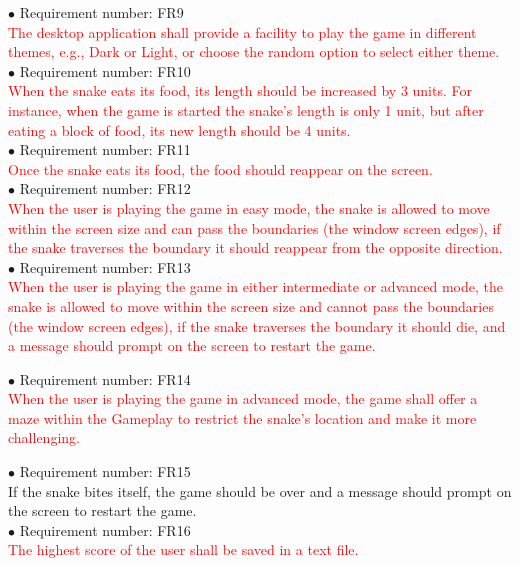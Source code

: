 \documentclass[12pt, titlepage]{article}
\begin{document}
$\bullet$ Requirement number: FR9\\
\textcolor{red}{The desktop application shall provide a facility to play the game in different themes, e.g., Dark or Light, or choose the random option to select either theme.}\\

$\bullet$ Requirement number: FR10\\
\textcolor{red}{When the snake eats its food, its length should be increased by 3 units. For instance, when the game is started the snake’s length is only 1 unit, but after eating a block of food, its new length should be 4 units.}\\

$\bullet$ Requirement number: FR11\\
\textcolor{red}{Once the snake eats its food, the food should reappear on the screen.}\\

$\bullet$ Requirement number: FR12\\
\textcolor{red}{When the user is playing the game in easy mode, the snake is allowed to move within the screen size and can pass the boundaries (the window screen edges), if the snake traverses the boundary it should reappear from the opposite direction.}\\

$\bullet$ Requirement number: FR13\\
\textcolor{red}{When the user is playing the game in either intermediate or advanced mode, the snake is allowed to move within the screen size and cannot pass the boundaries (the window screen edges), if the snake traverses the boundary it should die, and a message should prompt on the screen to restart the game.}

$\bullet$ Requirement number: FR14\\
\textcolor{red}{When the user is playing the game in advanced mode, the game shall offer a maze within the Gameplay to restrict the snake's location and make it more challenging.}

$\bullet$ Requirement number: FR15\\
If the snake bites itself, the game should be over and a message should prompt on the screen to restart the game.\\

$\bullet$ Requirement number: FR16\\
\textcolor{red}{The highest score of the user shall be saved in a text file.}\\
\end{document}
